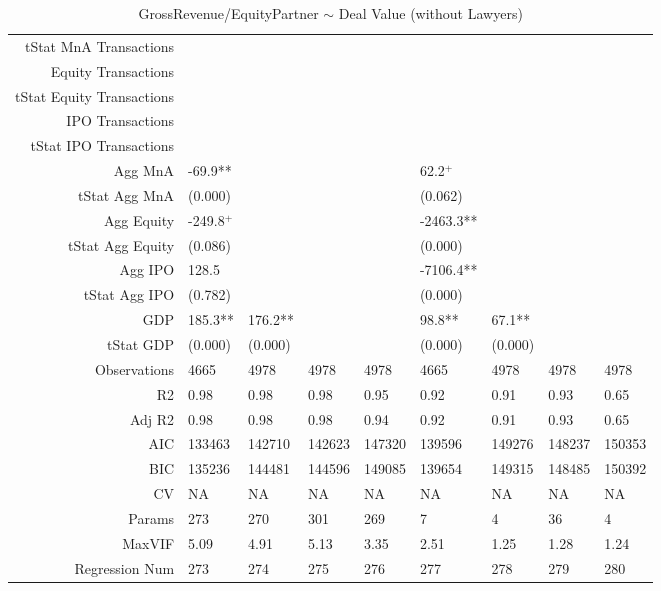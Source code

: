 \begin{table}[ht]
\begin{tabular}{rllllllll}
  tStat MnA Transactions &  &  &  &  &  &  &  &  \\ 
  Equity Transactions &  &  &  &  &  &  &  &  \\ 
  tStat Equity Transactions &  &  &  &  &  &  &  &  \\ 
  IPO Transactions &  &  &  &  &  &  &  &  \\ 
  tStat IPO Transactions &  &  &  &  &  &  &  &  \\ 
  Agg MnA & -69.9** &  &  &  & 62.2$^{+}$ &  &  &  \\ 
  tStat Agg MnA & (0.000) &  &  &  & (0.062) &  &  &  \\ 
  Agg Equity & -249.8$^{+}$ &  &  &  & -2463.3** &  &  &  \\ 
  tStat Agg Equity & (0.086) &  &  &  & (0.000) &  &  &  \\ 
  Agg IPO & 128.5 &  &  &  & -7106.4** &  &  &  \\ 
  tStat Agg IPO & (0.782) &  &  &  & (0.000) &  &  &  \\ 
  GDP & 185.3** & 176.2** &  &  & 98.8** & 67.1** &  &  \\ 
  tStat GDP & (0.000) & (0.000) &  &  & (0.000) & (0.000) &  &  \\ 
  Observations & 4665 & 4978 & 4978 & 4978 & 4665 & 4978 & 4978 & 4978 \\ 
  R2 & 0.98 & 0.98 & 0.98 & 0.95 & 0.92 & 0.91 & 0.93 & 0.65 \\ 
  Adj R2 & 0.98 & 0.98 & 0.98 & 0.94 & 0.92 & 0.91 & 0.93 & 0.65 \\ 
  AIC & 133463 & 142710 & 142623 & 147320 & 139596 & 149276 & 148237 & 150353 \\ 
  BIC & 135236 & 144481 & 144596 & 149085 & 139654 & 149315 & 148485 & 150392 \\ 
  CV & NA & NA & NA & NA & NA & NA & NA & NA \\ 
  Params & 273 & 270 & 301 & 269 & 7 & 4 & 36 & 4 \\ 
  MaxVIF & 5.09 & 4.91 & 5.13 & 3.35 & 2.51 & 1.25 & 1.28 & 1.24 \\ 
  Regression Num & 273 & 274 & 275 & 276 & 277 & 278 & 279 & 280 \\ 
   \hline
\end{tabular}
\caption{GrossRevenue/EquityPartner $\sim$ Deal Value (without Lawyers)} 
\end{table}
